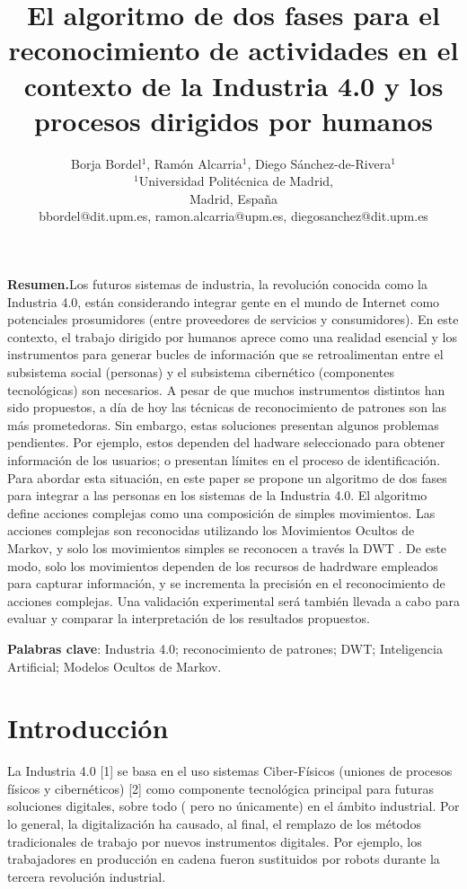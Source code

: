\documentclass{article}
\title {\textbf{El algoritmo de dos fases para el reconocimiento de actividades en el contexto de la Industria 4.0 y los procesos dirigidos por humanos
}}
\author{ Borja Bordel$^1$, Ramón Alcarria$^1$, Diego Sánchez-de-Rivera$^1$ \\
$^1$Universidad Politécnica de Madrid, \\
Madrid, España \\
bbordel@dit.upm.es, ramon.alcarria@upm.es, diegosanchez@dit.upm.es}
\begin{document}
\maketitle

\hspace{-0,5cm}\textbf{Resumen.}Los futuros sistemas de industria, la revolución conocida como la Industria 4.0, están considerando integrar gente en el mundo de Internet como potenciales prosumidores (entre proveedores de servicios y consumidores). En este contexto, el trabajo dirigido por humanos aprece como una realidad esencial y los instrumentos para generar bucles  de información que se retroalimentan entre el subsistema social (personas) y el subsistema cibernético (componentes tecnológicas) son necesarios. A pesar de que muchos instrumentos distintos han sido propuestos, a día de hoy las técnicas de reconocimiento de patrones son las más prometedoras. Sin embargo, estas soluciones presentan algunos problemas pendientes. Por ejemplo, estos dependen del hadware seleccionado para obtener información de los usuarios; o presentan límites en el proceso de identificación. Para abordar esta situación, en este paper se propone un algoritmo de dos fases para integrar a las personas en los sistemas de la Industria 4.0. El algoritmo define acciones complejas como una composición de simples movimientos. Las acciones complejas son reconocidas utilizando los Movimientos Ocultos de Markov, y solo los movimientos simples se reconocen a través la DWT . De este modo, solo los movimientos dependen de los recursos de hadrdware empleados para capturar información, y se incrementa  la precisión en el reconocimiento de acciones complejas. Una validación experimental será también llevada a cabo para evaluar y comparar la interpretación de los resultados propuestos.

\hspace{-0,5cm}\textbf{Palabras clave}: Industria 4.0; reconocimiento de patrones; DWT; Inteligencia Artificial; Modelos Ocultos de Markov.


\section{Introducción}
\hspace{-0,5cm}La Industria 4.0 [1] se basa en el uso sistemas Ciber-Físicos (uniones de procesos físicos y cibernéticos) [2] como componente tecnológica principal para futuras soluciones digitales, sobre todo  ( pero no únicamente) en el ámbito industrial. Por lo general, la digitalización ha causado, al final, el remplazo de los métodos tradicionales de trabajo por nuevos instrumentos digitales.
Por ejemplo, los trabajadores en producción en cadena fueron sustituidos por robots durante la tercera revolución industrial.
\end{document}

